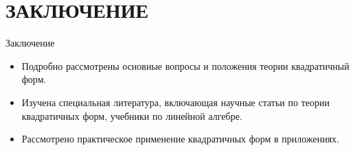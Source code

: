 \documentclass[10pt,pdf,hyperref={unicode}]{beamer}
\begin{document}
\section{ЗАКЛЮЧЕНИЕ}
\begin{frame}{Заключение}
\begin{block}

\begin{itemize}

\item{Подробно рассмотрены основные вопросы и положения теории квадратичный форм.}
\item{Изучена специальная литература, включающая научные статьи по теории квадратичных форм, учебники по линейной алгебре.}
\item{Рассмотрено практическое применение квадратичных форм в приложениях.}


\end{itemize}

\end{block}
\end{frame} 
\end{document}

